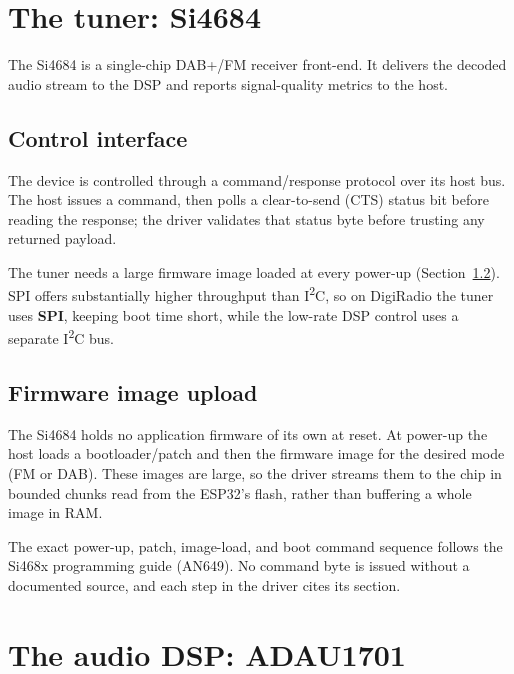 \section{The tuner: Si4684}
\label{sec:hw-si4684}

The Si4684 is a single-chip DAB+/FM receiver front-end. It delivers the
decoded audio stream to the DSP and reports signal-quality metrics to the
host.

\subsection{Control interface}
The device is controlled through a command/response protocol over its
host bus. The host issues a command, then polls a clear-to-send (CTS)
status bit before reading the response; the driver validates that status
byte before trusting any returned payload.

\begin{drkey}
The tuner needs a large firmware image loaded at every power-up
(Section~\ref{sec:hw-si4684-fw}). SPI offers substantially higher
throughput than I\textsuperscript{2}C, so on DigiRadio the tuner uses
\textbf{SPI}, keeping boot time short, while the low-rate DSP control uses
a separate I\textsuperscript{2}C bus.
\end{drkey}

\subsection{Firmware image upload}
\label{sec:hw-si4684-fw}
The Si4684 holds no application firmware of its own at reset. At power-up
the host loads a bootloader/patch and then the firmware image for the
desired mode (FM or DAB). These images are large, so the driver streams
them to the chip in bounded chunks read from the ESP32's flash, rather
than buffering a whole image in RAM.

\begin{drref}[Datasheet]
The exact power-up, patch, image-load, and boot command sequence follows
the Si468x programming guide (AN649). No command byte is issued without a
documented source, and each step in the driver cites its section.
\end{drref}

\section{The audio DSP: ADAU1701}
\label{sec:hw-adau}

